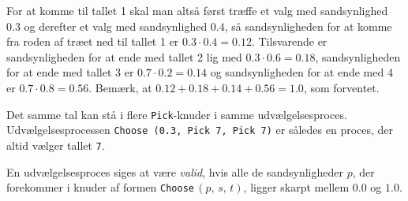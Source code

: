 \documentclass[a4paper,12pt]{article}
\begin{document}
For at komme til tallet 1 skal man altså først træffe et valg med
sandsynlighed $0.3$ og derefter et valg med sandsynlighed $0.4$, så
sandsynligheden for at komme fra roden af træet ned til tallet 1 er
$0.3\cdot0.4 = 0.12$.  Tilsvarende er sandsynligheden for at ende med
tallet 2 lig med $0.3\cdot0.6 = 0.18$, sandsynligheden for at ende med
tallet 3 er $0.7\cdot0.2=0.14$ og sandsynligheden for at ende med 4 er
$0.7\cdot0.8=0.56$.  Bemærk, at $0.12+0.18+0.14+0.56 = 1.0$, som
forventet.

Det samme tal kan stå i flere \lstinline{Pick}-knuder i samme
udvælgelsesproces.  Udvælgelsesprocessen
\lstinline{Choose (0.3, Pick 7, Pick 7)}
er således en proces, der altid vælger tallet \lstinline{7}.

En udvælgelsesproces siges at være \emph{valid}, hvis alle de
sandsynligheder $p$, der forekommer i knuder af formen
\lstinline{Choose}\,$(p,\,s,\,t)$, ligger skarpt mellem $0.0$ og
$1.0$.
\end{document}
